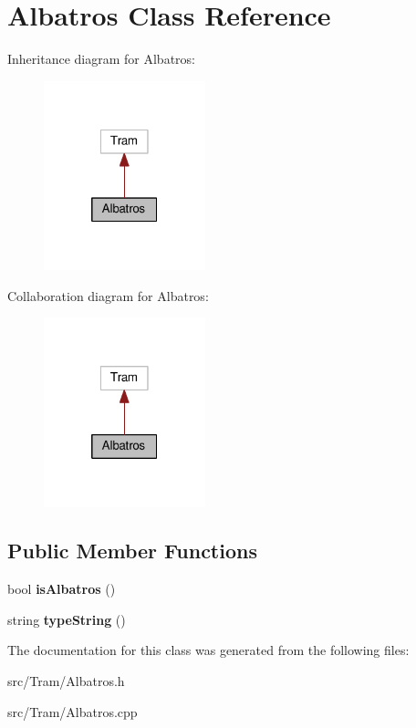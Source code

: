 \hypertarget{classAlbatros}{}\section{Albatros Class Reference}
\label{classAlbatros}


Inheritance diagram for Albatros\+:\nopagebreak
\begin{figure}[H]
\begin{center}
\leavevmode
\includegraphics[width=133pt]{classAlbatros__inherit__graph}
\end{center}
\end{figure}


Collaboration diagram for Albatros\+:\nopagebreak
\begin{figure}[H]
\begin{center}
\leavevmode
\includegraphics[width=133pt]{classAlbatros__coll__graph}
\end{center}
\end{figure}
\subsection*{Public Member Functions}
\begin{DoxyCompactItemize}
\item 
bool {\bfseries is\+Albatros} ()\hypertarget{classAlbatros_a899d40adaadbd53c0f99fd08a2c91cf7}{}\label{classAlbatros_a899d40adaadbd53c0f99fd08a2c91cf7}

\item 
string {\bfseries type\+String} ()\hypertarget{classAlbatros_ad1d8db48a50695b66117033911597513}{}\label{classAlbatros_ad1d8db48a50695b66117033911597513}

\end{DoxyCompactItemize}


The documentation for this class was generated from the following files\+:\begin{DoxyCompactItemize}
\item 
src/\+Tram/Albatros.\+h\item 
src/\+Tram/Albatros.\+cpp\end{DoxyCompactItemize}
